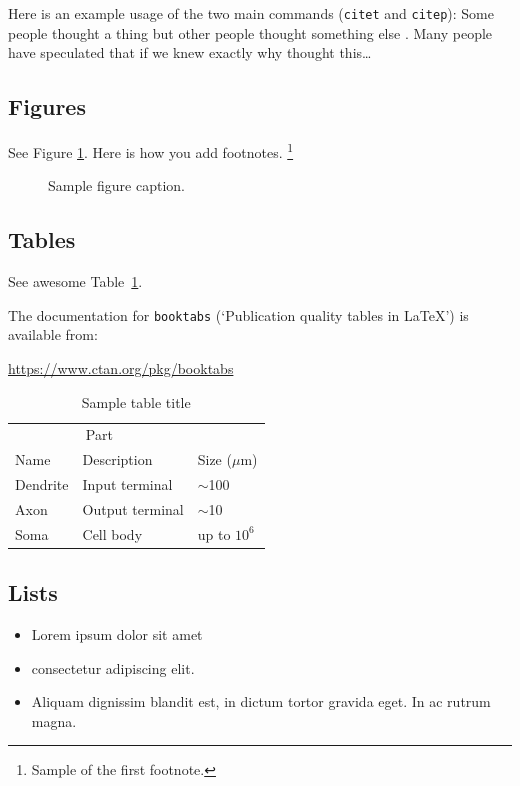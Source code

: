 \documentclass{article}
\begin{document}
Here is an example usage of the two main commands (\verb+citet+ and \verb+citep+): Some people thought a thing \citep{kour2014real, hadash2018estimate} but other people thought something else \citep{kour2014fast}. Many people have speculated that if we knew exactly why \citet{kour2014fast} thought this\dots

\subsection{Figures}
\lipsum[10]
See Figure \ref{fig:fig1}. Here is how you add footnotes. \footnote{Sample of the first footnote.}
\lipsum[11]

\begin{figure}
	\centering
	
	\caption{Sample figure caption.}
	\label{fig:fig1}
\end{figure}

\subsection{Tables}
See awesome Table~\ref{tab:table}.

The documentation for \verb+booktabs+ (`Publication quality tables in LaTeX') is available from:
\begin{center}
	\url{https://www.ctan.org/pkg/booktabs}
\end{center}


\begin{table}
	\caption{Sample table title}
	\centering
	\begin{tabular}{lll}
		\toprule
		\multicolumn{2}{c}{Part}                   \\
		\cmidrule(r){1-2}
		Name     & Description     & Size ($\mu$m) \\
		\midrule
		Dendrite & Input terminal  & $\sim$100     \\
		Axon     & Output terminal & $\sim$10      \\
		Soma     & Cell body       & up to $10^6$  \\
		\bottomrule
	\end{tabular}
	\label{tab:table}
\end{table}

\subsection{Lists}
\begin{itemize}
	\item Lorem ipsum dolor sit amet
	\item consectetur adipiscing elit.
	\item Aliquam dignissim blandit est, in dictum tortor gravida eget. In ac rutrum magna.
\end{itemize}




\end{document}
